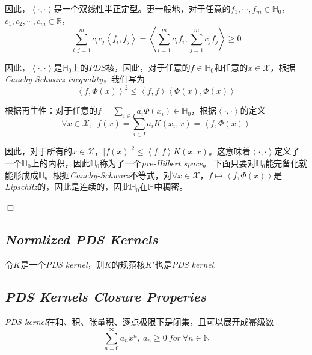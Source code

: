 因此，$\left< \cdot,\cdot \right>$是一个双线性半正定型。更一般地，对于任意的$f_1,\cdots,f_m\in \mathbb{H}_0$，$c_1,c_2,\cdots,c_m\in \mathbb{R}$，
\begin{equation}
    \sum_{i,j=1}^{m}c_ic_j\left< f_i,f_j \right>=\left< \sum_{i=1}^{m}c_if_i,\sum_{j=1}^{m}c_jf_j \right>\geqslant 0
\end{equation}

因此，$\left< \cdot,\cdot \right>$是$\mathbb{H}_0$上的$PDS$核，因此，对于任意的$f\in \mathbb{H}_0$和任意的$x\in \mathcal{X}$，根据\textsl{Cauchy-Schwarz inequality}，我们写为
\begin{equation}
    \left< f,\Phi(x) \right>^2\leqslant \left<f,f\right>\left<\Phi(x),\Phi(x)\right>
\end{equation}

根据再生性：对于任意的$f=\sum_{i\in I}a_i\Phi(x_i)\in \mathbb{H}_0$，根据$\left<\cdot,\cdot\right>$的定义
\begin{equation}
    \forall x\in \mathcal{X},\ \ f(x)=\sum_{i\in I}a_i K(x_i,x)=\left<f,\Phi(x)\right>
\end{equation}

因此，对于所有的$x\in \mathcal{X}$，$|f(x)|^2\leqslant \left<f,f\right>K(x,x)$。这意味着$\left<\cdot,\cdot\right>$定义了一个$\mathbb{H}_0$上的内积，因此$\mathbb{H}_0$称为了一个\textsl{pre-Hilbert space}。
下面只要对$\mathbb{H}_0$能完备化就能形成成$\mathbb{H}$。根据\textsl{Cauchy-Schwarz}不等式，对$\forall x\in \mathcal{X}$，$f\mapsto \left<f,\Phi(x)\right>$是\textsl{Lipschitz}的，因此是连续的，因此$\mathbb{H}_0$在$\mathbb{H}$中稠密。

$\Box$

\subsection*{\textsl{Normlized PDS Kernels}}

\begin{mdframed}
    \begin{lemma}
        令$K$是一个\textsl{PDS kernel}，则$K$的规范核$K'$也是\textsl{PDS kernel}.
    \end{lemma}
\end{mdframed}

\subsection*{\textsl{PDS Kernels Closure Properies}}

\begin{mdframed}
    \begin{theorem}
        \textsl{PDS kernel}在和、积、张量积、逐点极限下是闭集，且可以展开成幂级数
        \begin{equation}
            \sum^{\infty}_{n=0}a_nx^n,\ a_n\geqslant 0\ for\ \forall n\in \mathbb{N}
        \end{equation}
    \end{theorem}
\end{mdframed}

